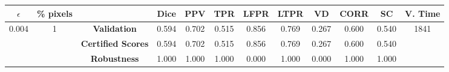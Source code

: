 \begin{longtable}{ c  c | c | c  c  c  c  c  c  c c c}
\toprule \textbf{$\epsilon$} & \textbf{\% pixels} & & \textbf{Dice} & \textbf{PPV} & \textbf{TPR} & \textbf{LFPR} & \textbf{LTPR} & \textbf{VD} & \textbf{CORR} & \textbf{SC} & \textbf{V. Time} \\
\midrule 
\multirow{3}{*}{0.004}  & \multirow{3}{*}{1} &\textbf{Validation} & 0.594 & 0.702 & 0.515 & 0.856 & 0.769 & 0.267 & 0.600 & 0.540 & \multirow{3}{*}{1841} \\
 & & \textbf{Certified Scores} & 0.594 & 0.702 & 0.515 & 0.856 & 0.769 & 0.267 & 0.600 & 0.540 & \\
& & \textbf{Robustness} & 1.000 & 1.000 & 1.000 & 0.000 & 1.000 & 0.000 & 1.000 & 1.000 & \\
\end{longtable}
